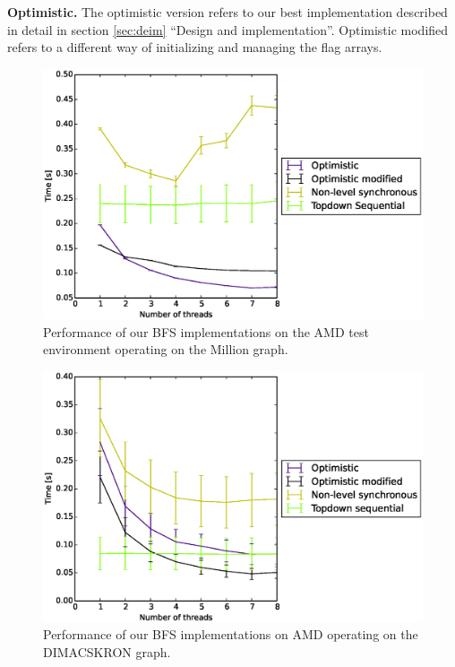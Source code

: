 \documentclass[letterpaper]{article}
\newcommand{\mypar}[1]{{\bf #1.}} %
\begin{document}
		\mypar{Optimistic}
		The optimistic version refers to our best implementation described in detail in section \ref{sec:deim} ``Design and implementation''.
		Optimistic modified refers to a different way of initializing and managing the flag arrays.


		\begin{figure}\centering
	  		\includegraphics[scale=0.33]{amd_biggraph.eps}
	  		\caption{Performance of our BFS implementations on the AMD test environment operating on the Million graph.\label{fig:amdbig}}
		\end{figure}
		\begin{figure}\centering
	  		\includegraphics[scale=0.33]{amd_dimacskron.eps}
	  		\caption{Performance of our BFS implementations on AMD operating on the DIMACSKRON graph.\label{fig:amdkron}}
		\end{figure}
\end{document}
